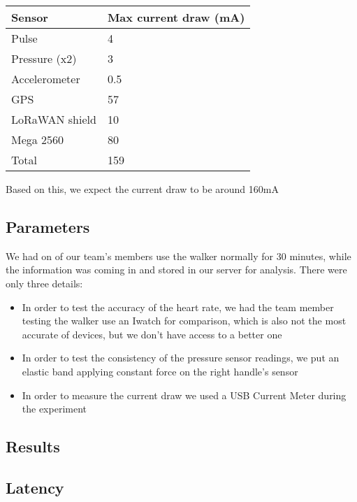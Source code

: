 			\begin{table}[h]
				\begin{tabular}{@{}ll@{}}
					\toprule
					Sensor         & Max current draw (mA) \\ \midrule
					Pulse          & 4                     \\
					Pressure (x2)  & 3                     \\
					Accelerometer  & 0.5                   \\
					GPS            & 57                    \\
					LoRaWAN shield & 10                    \\
					Mega 2560      & 80                    \\
					Total          & 159                   \\ \bottomrule
				\end{tabular}
			\end{table}

			Based on this, we expect the current draw to be around 160mA

	\subsection{Parameters}
		We had on of our team's members use the walker normally for 30 minutes, while the information was coming in and stored in our server for analysis. There were only three details:

		\begin{itemize}
		  \item In order to test the accuracy of the heart rate, we had the team member testing the walker use an Iwatch for comparison, which is also not the most accurate of devices, but we don't have access to a better one
		  \item In order to test the consistency of the pressure sensor readings, we put an elastic band applying constant force on the right handle's sensor
		  \item In order to measure the current draw we used a USB Current Meter during the experiment
		\end{itemize}

	\subsection{Results}
		\subsection{Latency}

